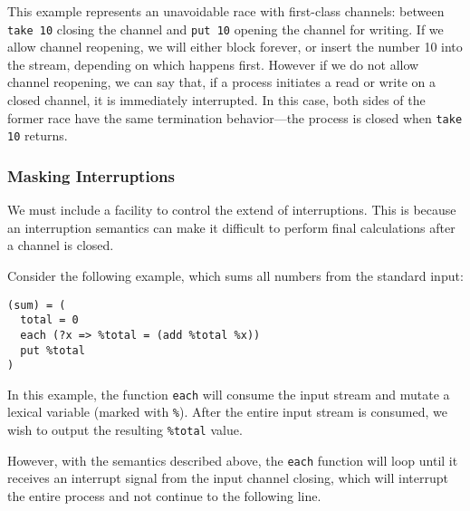 \ifsigpro{ \documentclass[english,PRO]{ipsj} }
\begin{document}
\noindent
This example represents an unavoidable race with first-class channels: between \verb/take 10/ closing the channel and \verb/put 10/ opening the channel for writing. If we allow channel reopening, we will either block forever, or insert the number 10 into the stream, depending on which happens first. However if we do not allow channel reopening, we can say that, if a process initiates a read or write on a closed channel, it is immediately interrupted. In this case, both sides of the former race have the same termination behavior---the process is closed when \verb/take 10/ returns.

\subsubsection{Masking Interruptions}\label{masking}\noindent
We must include a facility to control the extend of interruptions. This is because an interruption semantics can make it difficult to perform final calculations after a channel is closed.

Consider the following example, which sums all numbers from the standard input:
% 

\begin{lstlisting}
(sum) = (
  total = 0
  each (?x => %total = (add %total %x))
  put %total
)
\end{lstlisting}\noindent
In this example, the function \verb/each/ will consume the input stream and mutate a lexical variable (marked with \verb/%/). After the entire input stream is consumed, we wish to output the resulting \verb/%total/ value.

However, with the semantics described above, the \verb/each/ function will loop until it receives an interrupt signal from the input channel closing, which will interrupt the entire process and not continue to the following line.
\end{document}
